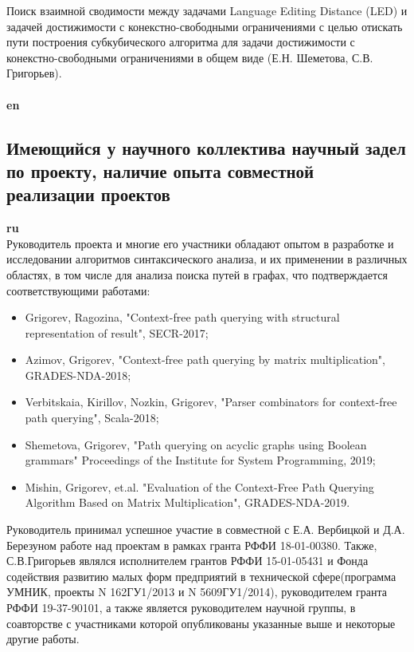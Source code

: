 \documentclass[12pt]{article}  %
\theoremstyle{remark}
\begin{document}
Поиск взаимной сводимости между задачами Language Editing Distance (LED) и задачей достижимости с конекстно-свободными ограничениями с целью отискать пути построения субкубического алгоритма для задачи достижимости с конекстно-свободными ограничениями в общем виде (Е.Н. Шеметова, С.В. Григорьев).
\\
\\
\textbf{en}\\

\subsection{Имеющийся у научного коллектива научный задел по проекту, наличие опыта совместной реализации проектов}

\textbf{ru}\\
%
Руководитель проекта и многие его участники обладают опытом в разработке и исследовании алгоритмов синтаксического анализа, и их применении в различных областях, в том числе для анализа поиска путей в графах, что подтверждается соответствующими работами:
\begin{itemize}
  \item Grigorev, Ragozina, "Context-free path querying with structural representation of result", SECR-2017;
  \item Azimov, Grigorev, "Context-free path querying by matrix multiplication", GRADES-NDA-2018;
  \item Verbitskaia, Kirillov, Nozkin, Grigorev, "Parser combinators for context-free path querying", Scala-2018;
  \item Shemetova, Grigorev, "Path querying on acyclic graphs using Boolean grammars" Proceedings of the Institute for System Programming, 2019;
  \item Mishin, Grigorev, et.al. "Evaluation of the Context-Free Path Querying Algorithm Based on Matrix Multiplication", GRADES-NDA-2019.
\end{itemize}

Руководитель принимал успешное участие в совместной с Е.А. Вербицкой и Д.А. Березуном работе над проектам в рамках гранта РФФИ 18-01-00380.
Также, С.В.Григорьев являлся исполнителем грантов РФФИ 15-01-05431 и Фонда содействия развитию малых форм предприятий в технической сфере(программа УМНИК, проекты N 162ГУ1/2013 и N 5609ГУ1/2014), руководителем гранта РФФИ 19-37-90101, а также является руководителем научной группы, в соавторстве с участниками которой опубликованы указанные выше и некоторые другие работы.
\end{document}
